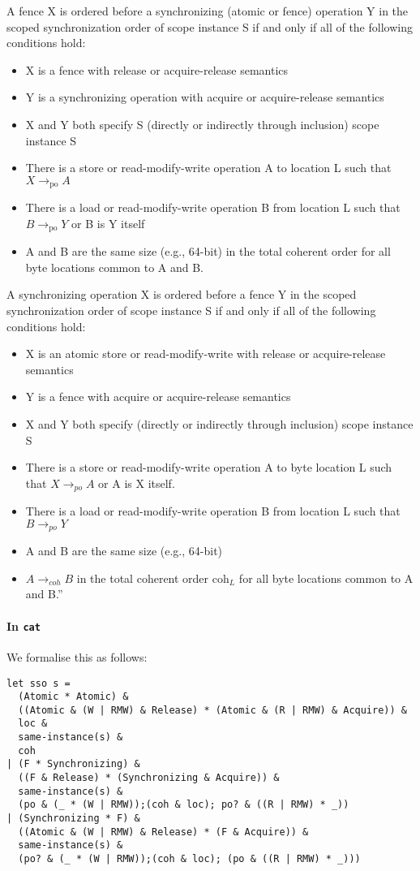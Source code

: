 \documentclass[a4paper]{article}
\begin{document}
A fence X is ordered before a synchronizing (atomic or fence) operation Y in
the scoped synchronization order of scope instance S if and only if all of the
following conditions hold:
\begin{itemize}
\item X is a fence with release or acquire-release semantics
\item Y is a synchronizing operation with acquire or acquire-release semantics
\item X and Y both specify S (directly or indirectly through inclusion) scope
instance S
\item There is a store or read-modify-write operation A to location L such that 
$X \rightarrow_{\text{po}} A$
\item There is a load or read-modify-write operation B from location L such
that $B \rightarrow_{\text{po}} Y$ or B is Y itself
\item A and B are the same size (e.g., 64-bit)  in the total coherent order
for all byte locations common to A and B.
\end{itemize}

A synchronizing operation X is ordered before a fence Y in the scoped
synchronization order of scope instance S if and only if all of the following
conditions hold:
\begin{itemize}
\item X is an atomic store or read-modify-write with release or acquire-release
semantics
\item Y is a fence with acquire or acquire-release semantics
\item X and Y both specify (directly or indirectly through inclusion) scope
instance S
\item There is a store or read-modify-write operation A to byte location L such
that $X \rightarrow_{po} A$ or A is X itself. 
\item There is a load or read-modify-write operation B from location L such
that $B \rightarrow_{po} Y$
\item A and B are the same size (e.g., 64-bit)
\item $A \rightarrow_{coh} B$ in the total coherent order coh$_L$ for all byte
locations common to A and B.''
\end{itemize}

\paragraph{In {\tt cat}}
We formalise this as follows:
\begin{verbatim}
let sso s =
  (Atomic * Atomic) &
  ((Atomic & (W | RMW) & Release) * (Atomic & (R | RMW) & Acquire)) &
  loc &
  same-instance(s) &
  coh
| (F * Synchronizing) &
  ((F & Release) * (Synchronizing & Acquire)) &
  same-instance(s) &
  (po & (_ * (W | RMW));(coh & loc); po? & ((R | RMW) * _))
| (Synchronizing * F) &
  ((Atomic & (W | RMW) & Release) * (F & Acquire)) &
  same-instance(s) &
  (po? & (_ * (W | RMW));(coh & loc); (po & ((R | RMW) * _)))

\end{verbatim} 
\end{document}
